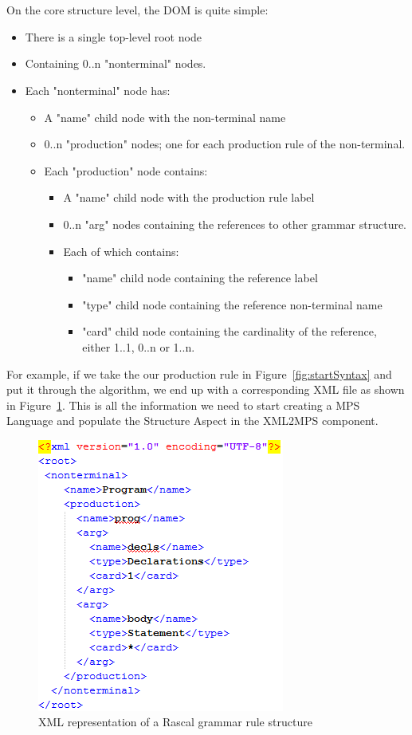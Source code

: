 \documentclass[a4paper, 11pt]{article}
\begin{document}
\\\\
On the core structure level, the DOM is quite simple:
\begin{itemize}
	\item There is a single top-level root node
	\item Containing 0..n "nonterminal" nodes.
	\item Each "nonterminal" node has:
	\begin{itemize}
		\item A "name" child node with the non-terminal name
		\item 0..n "production" nodes; one for each production rule of the non-terminal.
		\item Each "production" node contains:
		\begin{itemize}
			\item  A "name" child node with the production rule label
			\item 0..n "arg" nodes containing the references to other grammar structure.
			\item Each of which contains:
			\begin{itemize}
				\item "name" child node containing the reference label
				\item "type" child node containing the reference non-terminal name
				\item "card" child node containing the cardinality of the reference, either 1..1, 0..n or 1..n.
			\end{itemize}
		\end{itemize}
	\end{itemize}
\end{itemize}

For example, if we take the our production rule in Figure~\ref{fig:startSyntax} and put it through the algorithm, we end up with a corresponding XML file as shown in Figure~\ref{fig:XML}. This is all the information we need to start creating a MPS Language and populate the Structure Aspect in the XML2MPS component.

\begin{figure}[h]
	\centering
	\includegraphics[scale=0.7]{images/StartSyntaxXML.png}
	\caption{XML representation of a Rascal grammar rule structure}
	\label{fig:XML}
\end{figure}
\end{document}

